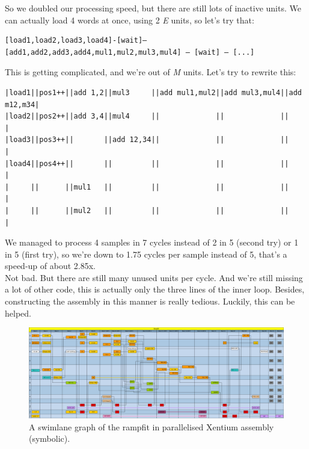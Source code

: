 \noindent
So we doubled our processing speed, but there are still lots of inactive units.
We can actually load 4 words at once, using 2 \emph{E} units, so let's try that:

\begin{lstlisting}
[load1,load2,load3,load4]-[wait]–[add1,add2,add3,add4,mul1,mul2,mul3,mul4] – [wait] – [...]
\end{lstlisting}


\noindent
This is getting complicated, and we're out of \emph{M} units.
Let's try to rewrite this:




\begin{lstlisting}
|load1||pos1++||add 1,2||mul3     ||add mul1,mul2||add mul3,mul4||add m12,m34|
|load2||pos2++||add 3,4||mul4     ||             ||             ||           |
|load3||pos3++||       ||add 12,34||             ||             ||           |
|load4||pos4++||       ||         ||             ||             ||           |
|     ||      ||mul1   ||         ||             ||             ||           |
|     ||      ||mul2   ||         ||             ||             ||           |
\end{lstlisting}

\noindent
We managed to process 4 samples in 7 cycles instead of 2 in 5 (second try) or 1
in 5 (first try), so we're down to 1.75 cycles per sample instead of 5, that's
a speed-up of about 2.85x. \\

\noindent
Not bad. But there are still many unused units per cycle. And we're still
missing a lot of other code, this is actually only the three lines of the inner
loop. Besides, constructing the assembly in this manner is really tedious.
Luckily, this can be helped. \\

\begin{figure}
\begin{center}
	\includegraphics[width=1.0\columnwidth]{images/rampfit_xen}
	\caption{A swimlane graph of the rampfit in parallelised Xentium
		assembly (symbolic).}
	\label{fig:xenramp}
\end{center}
\end{figure}

